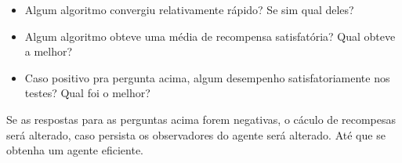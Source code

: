 \begin{itemize}
   \item Algum algoritmo convergiu relativamente rápido? Se sim qual deles?
   \item Algum algoritmo obteve uma média de recompensa satisfatória? Qual obteve a melhor?
   \item Caso positivo pra pergunta acima, algum desempenho satisfatoriamente nos testes? Qual foi o melhor?
\end{itemize}

Se as respostas para as perguntas acima forem negativas, o cáculo de recompesas será alterado, caso persista os observadores do agente será alterado. Até que se obtenha um agente eficiente.

 